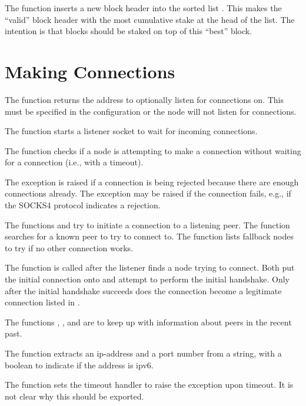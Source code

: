The function {} inserts a new block header into the sorted
list {}.
This makes the ``valid'' block header with the most cumulative stake at the head of the
list. The intention is that blocks should be staked on top of this ``best'' block.

\section{Making Connections}

The function {} returns the address to optionally listen for connections on.
This must be specified in the configuration or the node will not listen for connections.

The function {} starts a listener socket to wait for incoming connections.

The function {} checks if a node is attempting to make a connection
without waiting for a connection (i.e., with a timeout).

The exception {} is raised if a connection is being rejected
because there are enough connections already.
The exception {} may be raised if the connection fails, e.g.,
if the SOCKS4 protocol indicates a rejection.

The functions {} and {}
try to initiate a connection to a listening peer.
The function {} searches for a known peer to try to connect to.
The function {} lists fallback nodes to try if no other connection works.

The function {} is called after the listener finds
a node trying to connect.
Both put the initial connection onto {}
and attempt to perform the initial handshake. Only after the initial handshake
succeeds does the connection become a legitimate connection listed
in {}.

The functions
{},
{},
{} and
{}
are to keep up with information about peers in the recent past.

The function {} extracts an ip-address and a port number
from a string, with a boolean to indicate if the address is ipv6.

The function {} sets the timeout handler to raise the exception {}
upon timeout. It is not clear why this should be exported.

